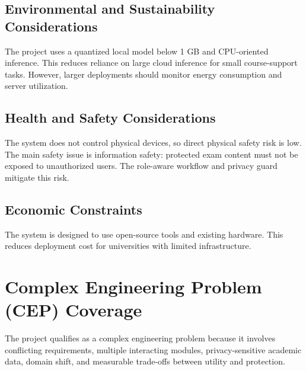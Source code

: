\subsection{Environmental and Sustainability Considerations}
The project uses a quantized local model below 1 GB and CPU-oriented inference. This reduces reliance on large cloud inference for small course-support tasks. However, larger deployments should monitor energy consumption and server utilization.

\subsection{Health and Safety Considerations}
The system does not control physical devices, so direct physical safety risk is low. The main safety issue is information safety: protected exam content must not be exposed to unauthorized users. The role-aware workflow and privacy guard mitigate this risk.

\subsection{Economic Constraints}
The system is designed to use open-source tools and existing hardware. This reduces deployment cost for universities with limited infrastructure.

\section{Complex Engineering Problem (CEP) Coverage}

The project qualifies as a complex engineering problem because it involves conflicting requirements, multiple interacting modules, privacy-sensitive academic data, domain shift, and measurable trade-offs between utility and protection.

